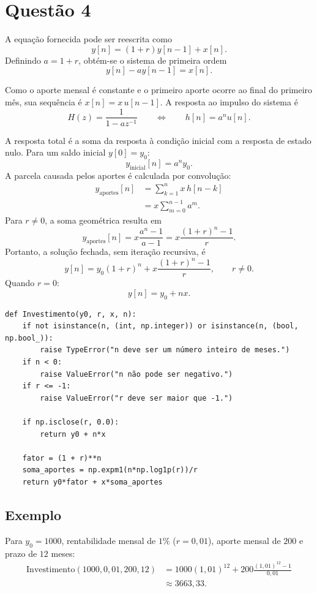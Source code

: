 \documentclass[12pt]{article}
\begin{document}
\section*{Questão 4}

A equação fornecida pode ser reescrita como
\[
y[n]=(1+r)y[n-1]+x[n].
\]
Definindo $a=1+r$, obtém-se o sistema de primeira ordem
\[
y[n]-ay[n-1]=x[n].
\]

Como o aporte mensal é constante e o primeiro aporte ocorre ao final do primeiro
mês, sua sequência é $x[n]=x\,u[n-1]$. A resposta ao impulso do sistema é
\[
H(z)=\frac{1}{1-az^{-1}}
\qquad\Longleftrightarrow\qquad
h[n]=a^n u[n].
\]

A resposta total é a soma da resposta à condição inicial com a resposta de estado
nulo. Para um saldo inicial $y[0]=y_0$:
\[
y_{\mathrm{inicial}}[n]=a^n y_0.
\]
A parcela causada pelos aportes é calculada por convolução:
\[
\begin{aligned}
y_{\mathrm{aportes}}[n]
  &=\sum_{k=1}^{n}x\,h[n-k] \\
  &=x\sum_{m=0}^{n-1}a^m.
\end{aligned}
\]
Para $r\neq 0$, a soma geométrica resulta em
\[
y_{\mathrm{aportes}}[n]
=x\frac{a^n-1}{a-1}
=x\frac{(1+r)^n-1}{r}.
\]
Portanto, a solução fechada, sem iteração recursiva, é
\[
\boxed{
y[n]=y_0(1+r)^n+x\frac{(1+r)^n-1}{r}
},\qquad r\neq 0.
\]
Quando $r=0$:
\[
\boxed{y[n]=y_0+nx}.
\]

\begin{verbatim}
def Investimento(y0, r, x, n):
    if not isinstance(n, (int, np.integer)) or isinstance(n, (bool, np.bool_)):
        raise TypeError("n deve ser um número inteiro de meses.")
    if n < 0:
        raise ValueError("n não pode ser negativo.")
    if r <= -1:
        raise ValueError("r deve ser maior que -1.")

    if np.isclose(r, 0.0):
        return y0 + n*x

    fator = (1 + r)**n
    soma_aportes = np.expm1(n*np.log1p(r))/r
    return y0*fator + x*soma_aportes
\end{verbatim}

\subsection*{Exemplo}

Para $y_0=1000$, rentabilidade mensal de $1\%$ ($r=0{,}01$), aporte mensal de
$200$ e prazo de $12$ meses:
\[
\begin{aligned}
\mathrm{Investimento}(1000,0{,}01,200,12)
&=1000(1{,}01)^{12}
  +200\frac{(1{,}01)^{12}-1}{0{,}01}\\
&\approx 3663{,}33.
\end{aligned}
\]
\end{document}
